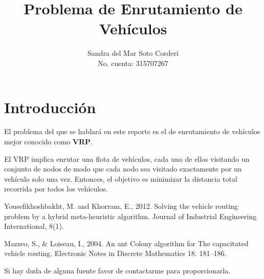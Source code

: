 \documentclass{article}
\title{Problema de Enrutamiento de Veh\'iculos}
\author{
  Sandra del Mar Soto Corderi\\
  No. cuenta: 315707267
}
\date{}
\begin{document}
\maketitle

\section{Introducción}

El problema del que se hablará en este reporte es el de enrutamiento de vehículos mejor conocido como \textbf{VRP}. 

El VRP implica enrutar una flota de vehículos, cada uno de ellos visitando un conjunto de nodos de modo que cada nodo sea visitado exactamente por un vehículo solo una vez. Entonces, el objetivo es minimizar la distancia total recorrida por todos los vehículos.



\begin{thebibliography}{9}
	Yousefikhoshbakht, M. and Khorram, E., 2012. Solving the vehicle routing problem by a hybrid meta-heuristic algorithm. Journal of Industrial Engineering International, 8(1).
	
	Mazzeo, S., \& Loiseau, I., 2004. An ant Colony algorithm for The capacitated vehicle routing. Electronic Notes in Discrete Mathematics 18. 181–186.
\end{thebibliography}

Si hay duda de alguna fuente favor de contactarme para proporcionarla.
\end{document}
